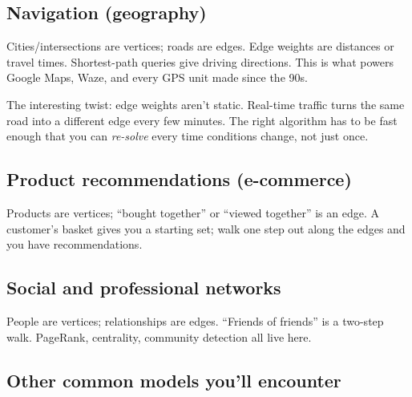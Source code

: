 \documentclass[11pt]{article}
\begin{document}
\subsection*{Navigation (geography)}

Cities/intersections are vertices; roads are edges. Edge weights are distances or travel times. Shortest-path queries give driving directions. This is what powers Google Maps, Waze, and every GPS unit made since the 90s.

The interesting twist: edge weights aren't static. Real-time traffic turns the same road into a different edge every few minutes. The right algorithm has to be fast enough that you can \emph{re-solve} every time conditions change, not just once.

\subsection*{Product recommendations (e-commerce)}

Products are vertices; ``bought together'' or ``viewed together'' is an edge. A customer's basket gives you a starting set; walk one step out along the edges and you have recommendations.

\subsection*{Social and professional networks}

People are vertices; relationships are edges. ``Friends of friends'' is a two-step walk. PageRank, centrality, community detection all live here.

\subsection*{Other common models you'll encounter}
\end{document}
